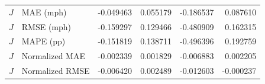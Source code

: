 \begin{tabular}{llrrrr}
$J$ & MAE (mph) & -0.049463 & 0.055179 & -0.186537 & 0.087610 \\

$J$ & RMSE (mph) & -0.159297 & 0.129466 & -0.480909 & 0.162315 \\

$J$ & MAPE (pp) & -0.151819 & 0.138711 & -0.496396 & 0.192759 \\

$J$ & Normalized MAE & -0.002339 & 0.001829 & -0.006883 & 0.002205 \\

$J$ & Normalized RMSE & -0.006420 & 0.002489 & -0.012603 & -0.000237 \\

\bottomrule
\end{tabular}
\endgroup
